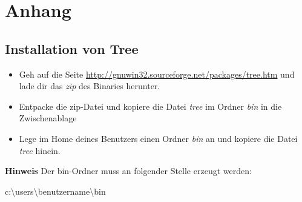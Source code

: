 \documentclass[
  ngerman,
  letterpaper,
  DIV=11]{scrreprt}
\newenvironment{Shaded}{\begin{snugshade}}{\end{snugshade}}
\newcommand{\ExtensionTok}[1]{\textcolor[rgb]{0.00,0.23,0.31}{#1}}
\begin{document}

\chapter{Anhang}\label{anhang}

\section{Installation von Tree}\label{installation-von-tree}

\begin{itemize}
\item
  Geh auf die Seite
  \url{http://gnuwin32.sourceforge.net/packages/tree.htm} und lade dir
  das \emph{zip} des Binaries herunter.
\item
  Entpacke die zip-Datei und kopiere die Datei \emph{tree} im Ordner
  \emph{bin} in die Zwischenablage
\item
  Lege im Home deines Benutzers einen Ordner \emph{bin} an und kopiere
  die Datei \emph{tree} hinein.
\end{itemize}

\samplestart

\textbf{Hinweis} Der bin-Ordner muss an folgender Stelle erzeugt werden:

\begin{Shaded}
\begin{Highlighting}[]
\ExtensionTok{c:\textbackslash{}users\textbackslash{}benutzername\textbackslash{}bin} 
\end{Highlighting}
\end{Shaded}

\sampleend
\end{document}
